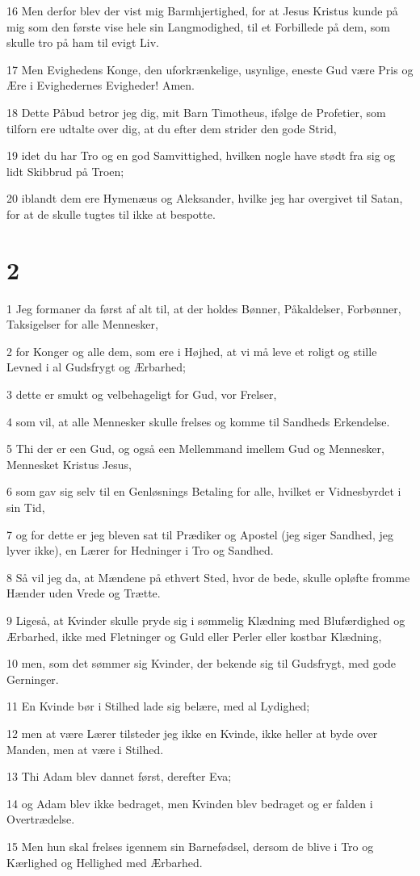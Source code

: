 \par 16 Men derfor blev der vist mig Barmhjertighed, for at Jesus Kristus kunde på mig som den første vise hele sin Langmodighed, til et Forbillede på dem, som skulle tro på ham til evigt Liv.
\par 17 Men Evighedens Konge, den uforkrænkelige, usynlige, eneste Gud være Pris og Ære i Evighedernes Evigheder! Amen.
\par 18 Dette Påbud betror jeg dig, mit Barn Timotheus, ifølge de Profetier, som tilforn ere udtalte over dig, at du efter dem strider den gode Strid,
\par 19 idet du har Tro og en god Samvittighed, hvilken nogle have stødt fra sig og lidt Skibbrud på Troen;
\par 20 iblandt dem ere Hymenæus og Aleksander, hvilke jeg har overgivet til Satan, for at de skulle tugtes til ikke at bespotte.

\chapter{2}

\par 1 Jeg formaner da først af alt til, at der holdes Bønner, Påkaldelser, Forbønner, Taksigelser for alle Mennesker,
\par 2 for Konger og alle dem, som ere i Højhed, at vi må leve et roligt og stille Levned i al Gudsfrygt og Ærbarhed;
\par 3 dette er smukt og velbehageligt for Gud, vor Frelser,
\par 4 som vil, at alle Mennesker skulle frelses og komme til Sandheds Erkendelse.
\par 5 Thi der er een Gud, og også een Mellemmand imellem Gud og Mennesker, Mennesket Kristus Jesus,
\par 6 som gav sig selv til en Genløsnings Betaling for alle, hvilket er Vidnesbyrdet i sin Tid,
\par 7 og for dette er jeg bleven sat til Prædiker og Apostel (jeg siger Sandhed, jeg lyver ikke), en Lærer for Hedninger i Tro og Sandhed.
\par 8 Så vil jeg da, at Mændene på ethvert Sted, hvor de bede, skulle opløfte fromme Hænder uden Vrede og Trætte.
\par 9 Ligeså, at Kvinder skulle pryde sig i sømmelig Klædning med Blufærdighed og Ærbarhed, ikke med Fletninger og Guld eller Perler eller kostbar Klædning,
\par 10 men, som det sømmer sig Kvinder, der bekende sig til Gudsfrygt, med gode Gerninger.
\par 11 En Kvinde bør i Stilhed lade sig belære, med al Lydighed;
\par 12 men at være Lærer tilsteder jeg ikke en Kvinde, ikke heller at byde over Manden, men at være i Stilhed.
\par 13 Thi Adam blev dannet først, derefter Eva;
\par 14 og Adam blev ikke bedraget, men Kvinden blev bedraget og er falden i Overtrædelse.
\par 15 Men hun skal frelses igennem sin Barnefødsel, dersom de blive i Tro og Kærlighed og Hellighed med Ærbarhed.

